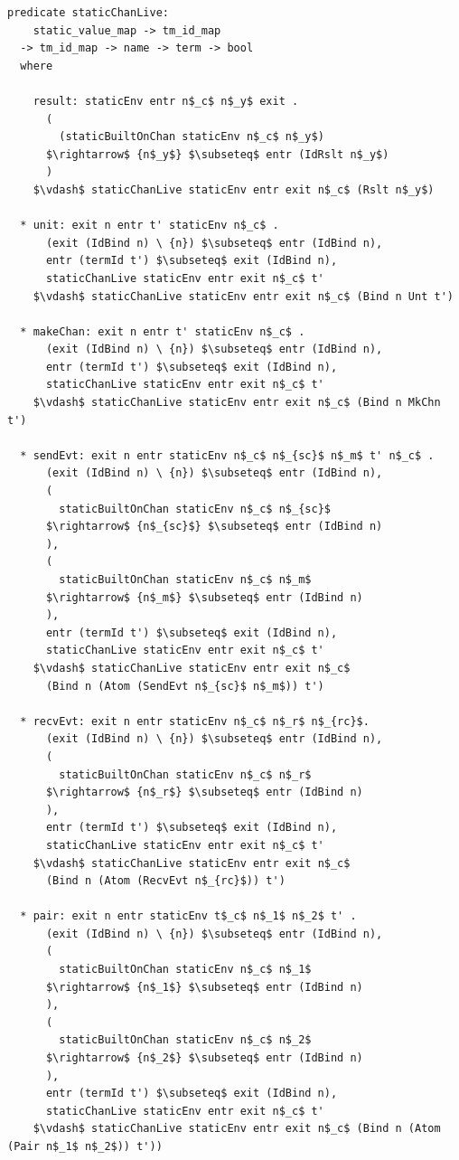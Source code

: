 \documentclass[letterpaper, 11pt]{extarticle}
\begin{document}
\begin{lstlisting}[language=logic, mathescape]
  predicate staticChanLive:
    static_value_map -> tm_id_map 
  -> tm_id_map -> name -> term -> bool
  where

    result: staticEnv entr n$_c$ n$_y$ exit .
      (
        (staticBuiltOnChan staticEnv n$_c$ n$_y$)
      $\rightarrow$ {n$_y$} $\subseteq$ entr (IdRslt n$_y$)
      )
    $\vdash$ staticChanLive staticEnv entr exit n$_c$ (Rslt n$_y$)

  * unit: exit n entr t' staticEnv n$_c$ .
      (exit (IdBind n) \ {n}) $\subseteq$ entr (IdBind n),
      entr (termId t') $\subseteq$ exit (IdBind n),
      staticChanLive staticEnv entr exit n$_c$ t'
    $\vdash$ staticChanLive staticEnv entr exit n$_c$ (Bind n Unt t')

  * makeChan: exit n entr t' staticEnv n$_c$ .
      (exit (IdBind n) \ {n}) $\subseteq$ entr (IdBind n),
      entr (termId t') $\subseteq$ exit (IdBind n),
      staticChanLive staticEnv entr exit n$_c$ t'
    $\vdash$ staticChanLive staticEnv entr exit n$_c$ (Bind n MkChn t')

  * sendEvt: exit n entr staticEnv n$_c$ n$_{sc}$ n$_m$ t' n$_c$ .
      (exit (IdBind n) \ {n}) $\subseteq$ entr (IdBind n),
      (
        staticBuiltOnChan staticEnv n$_c$ n$_{sc}$
      $\rightarrow$ {n$_{sc}$} $\subseteq$ entr (IdBind n)
      ),
      (
        staticBuiltOnChan staticEnv n$_c$ n$_m$
      $\rightarrow$ {n$_m$} $\subseteq$ entr (IdBind n)
      ),
      entr (termId t') $\subseteq$ exit (IdBind n),
      staticChanLive staticEnv entr exit n$_c$ t'
    $\vdash$ staticChanLive staticEnv entr exit n$_c$
      (Bind n (Atom (SendEvt n$_{sc}$ n$_m$)) t')

  * recvEvt: exit n entr staticEnv n$_c$ n$_r$ n$_{rc}$.   
      (exit (IdBind n) \ {n}) $\subseteq$ entr (IdBind n),
      (
        staticBuiltOnChan staticEnv n$_c$ n$_r$
      $\rightarrow$ {n$_r$} $\subseteq$ entr (IdBind n)
      ),
      entr (termId t') $\subseteq$ exit (IdBind n),
      staticChanLive staticEnv entr exit n$_c$ t'
    $\vdash$ staticChanLive staticEnv entr exit n$_c$
      (Bind n (Atom (RecvEvt n$_{rc}$)) t')

  * pair: exit n entr staticEnv t$_c$ n$_1$ n$_2$ t' .
      (exit (IdBind n) \ {n}) $\subseteq$ entr (IdBind n),
      (
        staticBuiltOnChan staticEnv n$_c$ n$_1$
      $\rightarrow$ {n$_1$} $\subseteq$ entr (IdBind n)
      ),
      (
        staticBuiltOnChan staticEnv n$_c$ n$_2$
      $\rightarrow$ {n$_2$} $\subseteq$ entr (IdBind n)
      ),
      entr (termId t') $\subseteq$ exit (IdBind n),
      staticChanLive staticEnv entr exit n$_c$ t'
    $\vdash$ staticChanLive staticEnv entr exit n$_c$ (Bind n (Atom (Pair n$_1$ n$_2$)) t'))


\end{lstlisting}
\end{document}
